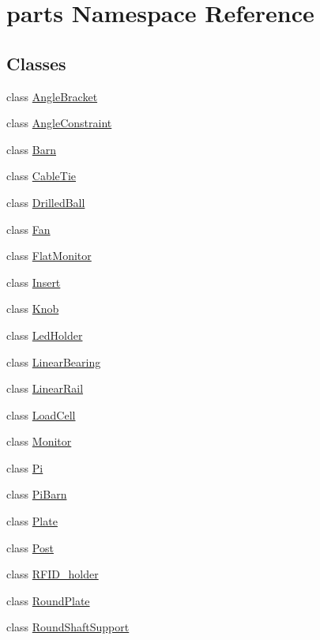 \hypertarget{namespaceparts}{}\section{parts Namespace Reference}
\label{namespaceparts}
\subsection*{Classes}
\begin{DoxyCompactItemize}
\item 
class \hyperlink{classparts_1_1_angle_bracket}{Angle\+Bracket}
\item 
class \hyperlink{classparts_1_1_angle_constraint}{Angle\+Constraint}
\item 
class \hyperlink{classparts_1_1_barn}{Barn}
\item 
class \hyperlink{classparts_1_1_cable_tie}{Cable\+Tie}
\item 
class \hyperlink{classparts_1_1_drilled_ball}{Drilled\+Ball}
\item 
class \hyperlink{classparts_1_1_fan}{Fan}
\item 
class \hyperlink{classparts_1_1_flat_monitor}{Flat\+Monitor}
\item 
class \hyperlink{classparts_1_1_insert}{Insert}
\item 
class \hyperlink{classparts_1_1_knob}{Knob}
\item 
class \hyperlink{classparts_1_1_led_holder}{Led\+Holder}
\item 
class \hyperlink{classparts_1_1_linear_bearing}{Linear\+Bearing}
\item 
class \hyperlink{classparts_1_1_linear_rail}{Linear\+Rail}
\item 
class \hyperlink{classparts_1_1_load_cell}{Load\+Cell}
\item 
class \hyperlink{classparts_1_1_monitor}{Monitor}
\item 
class \hyperlink{classparts_1_1_pi}{Pi}
\item 
class \hyperlink{classparts_1_1_pi_barn}{Pi\+Barn}
\item 
class \hyperlink{classparts_1_1_plate}{Plate}
\item 
class \hyperlink{classparts_1_1_post}{Post}
\item 
class \hyperlink{classparts_1_1_r_f_i_d__holder}{R\+F\+I\+D\+\_\+holder}
\item 
class \hyperlink{classparts_1_1_round_plate}{Round\+Plate}
\item 
class \hyperlink{classparts_1_1_round_shaft_support}{Round\+Shaft\+Support}

\end{DoxyCompactItemize}
